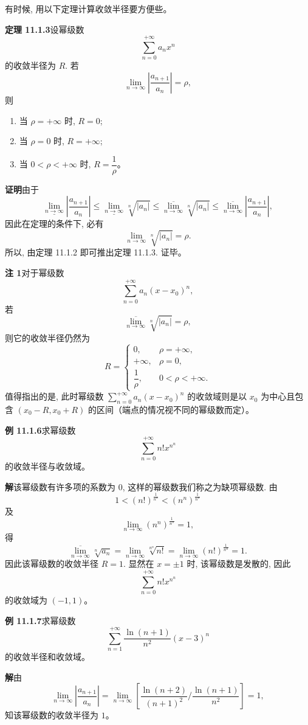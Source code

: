 \documentclass[UTF8,12pt,a4paper,fontset=fandol]{ctexart}
\begin{document}
有时候, 用以下定理计算收敛半径要方便些。

\noindent\textbf{定理 11.1.3}\quad 设幂级数
\[
  \sum_{n=0}^{+\infty}a_nx^n
\]
的收敛半径为 $R$. 若
\[
  \lim_{n\to\infty}\left|\frac{a_{n+1}}{a_n}\right|=\rho,
\]
则
\begin{enumerate}
  \item 当 $\rho=+\infty$ 时, $R=0$;
  \item 当 $\rho=0$ 时, $R=+\infty$;
  \item 当 $0<\rho<+\infty$ 时, $R=\dfrac1\rho$。
\end{enumerate}

\noindent\textbf{证明}\quad 由于
\[
  \underline{\lim_{n\to\infty}}\left|\frac{a_{n+1}}{a_n}\right|
  \leqslant
  \underline{\lim_{n\to\infty}}\sqrt[n]{|a_n|}
  \leqslant
  \overline{\lim_{n\to\infty}}\sqrt[n]{|a_n|}
  \leqslant
  \overline{\lim_{n\to\infty}}\left|\frac{a_{n+1}}{a_n}\right|,
\]
因此在定理的条件下, 必有
\[
  \lim_{n\to\infty}\sqrt[n]{|a_n|}=\rho.
\]
所以, 由定理 11.1.2 即可推出定理 11.1.3. 证毕。

\noindent\textbf{注 1}\quad 对于幂级数
\[
  \sum_{n=0}^{+\infty}a_n(x-x_0)^n,
\]
若
\[
  \overline{\lim_{n\to\infty}}\sqrt[n]{|a_n|}=\rho,
\]
则它的收敛半径仍然为
\[
  R=
  \begin{cases}
    0, & \rho=+\infty,\\
    +\infty, & \rho=0,\\
    \dfrac1\rho, & 0<\rho<+\infty.
  \end{cases}
\]
值得指出的是, 此时幂级数 $\sum_{n=0}^{+\infty}a_n(x-x_0)^n$ 的收敛域则是以 $x_0$ 为中心且包含 $(x_0-R,x_0+R)$ 的区间（端点的情况视不同的幂级数而定）。

\noindent\textbf{例 11.1.6}\quad 求幂级数
\[
  \sum_{n=0}^{+\infty}n!x^{n^n}
\]
的收敛半径与收敛域。

\noindent\textbf{解}\quad 该幂级数有许多项的系数为 $0$, 这样的幂级数我们称之为缺项幂级数. 由
\[
  1<(n!)^{\frac1{n^n}}<(n^n)^{\frac1{n^n}}
\]
及
\[
  \lim_{n\to\infty}(n^n)^{\frac1{n^n}}=1,
\]
得
\[
  \overline{\lim_{n\to\infty}}\sqrt[n]{a_n}
  =
  \lim_{n\to\infty}\sqrt[n^n]{n!}
  =
  \lim_{n\to\infty}(n!)^{\frac1{n^n}}
  =1.
\]
因此该幂级数的收敛半径 $R=1$. 显然在 $x=\pm1$ 时, 该幂级数是发散的, 因此
\[
  \sum_{n=0}^{+\infty}n!x^{n^n}
\]
的收敛域为 $(-1,1)$。

\noindent\textbf{例 11.1.7}\quad 求幂级数
\[
  \sum_{n=1}^{+\infty}\frac{\ln(n+1)}{n^2}(x-3)^n
\]
的收敛半径和收敛域。

\noindent\textbf{解}\quad 由
\[
  \lim_{n\to\infty}\left|\frac{a_{n+1}}{a_n}\right|
  =
  \lim_{n\to\infty}
  \left[
    \frac{\ln(n+2)}{(n+1)^2}\Big/\frac{\ln(n+1)}{n^2}
  \right]
  =1,
\]
知该幂级数的收敛半径为 $1$。
\end{document}
